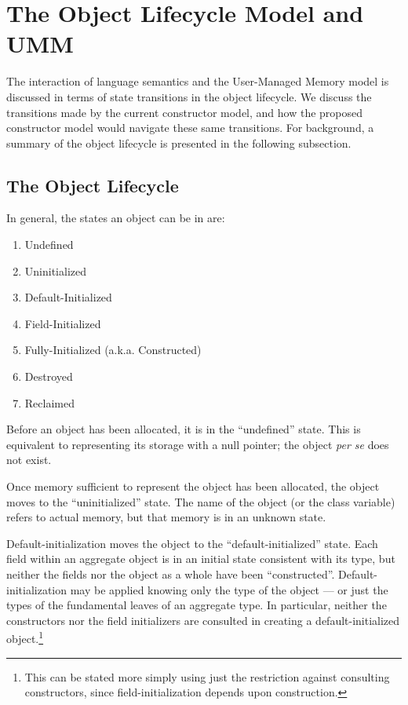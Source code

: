 \section{The Object Lifecycle Model and UMM}
\label{Objects}


The interaction of language semantics and the User-Managed Memory model is discussed
in terms of state transitions in the object lifecycle.  We discuss the
transitions made by the current constructor model, and how the proposed constructor model
would navigate these same transitions.  For background, a summary of the
object lifecycle is presented in the following subsection.  


\subsection{The Object Lifecycle}

In general, the states an object can be in are:
\begin{enumerate}
\item Undefined
\item Uninitialized
\item Default-Initialized
\item Field-Initialized
\item Fully-Initialized (a.k.a. Constructed)
\item Destroyed
\item Reclaimed
\end{enumerate}

Before an object has been allocated, it is in the ``undefined'' state.  This is
equivalent to representing its storage with a null pointer; the object {\it per
se} does not exist.

Once memory sufficient to represent the object has been allocated, the object
moves to the ``uninitialized'' state.  The name of the object (or the class
variable) refers to actual memory, but that memory is in an unknown state.

Default-initialization moves the object to the ``default-initialized'' state.  Each
field within an aggregate object is in an initial state consistent with its type,
but neither the fields nor the object as a whole have been ``constructed''.
Default-initialization may be applied knowing only the type of the object --- or
just the types of the fundamental leaves of an aggregate type.  In particular,
neither the constructors nor the field initializers are consulted in creating a
default-initialized object.\footnote{This can be stated more simply using just the
  restriction against consulting constructors, since field-initialization
  depends upon construction.}

